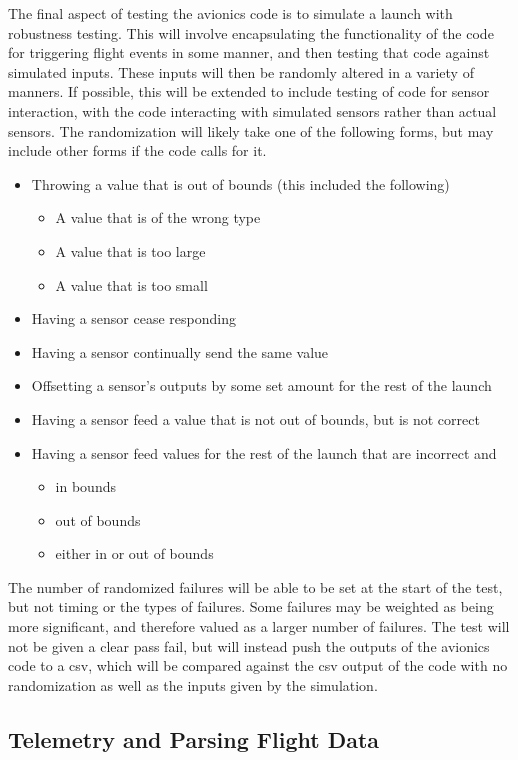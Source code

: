 \documentclass[onecolumn, draftclsnofoot, 10pt, compsoc]{IEEEtran}
\begin{document}
The final aspect of testing the avionics code is to simulate a launch with robustness testing. This will involve encapsulating the functionality of the code for triggering flight events in some manner, and then testing that code against simulated inputs. These inputs will then be randomly altered in a variety of manners. If possible, this will be extended to include testing of code for sensor interaction, with the code interacting with simulated sensors rather than actual sensors. The randomization will likely take one of the following forms, but may include other forms if the code calls for it. 
\begin{itemize}
\item Throwing a value that is out of bounds (this included the following)
\begin{itemize}
\item A value that is of the wrong type
\item A value that is too large
\item A value that is too small
\end{itemize}
\item Having a sensor cease responding
\item Having a sensor continually send the same value
\item Offsetting a sensor’s outputs by some set amount for the rest of the launch
\item Having a sensor feed a value that is not out of bounds, but is not correct
\item Having a sensor feed values for the rest of the launch that are incorrect and
\begin{itemize}
\item in bounds 
\item out of bounds
\item either in or out of bounds
\end{itemize}
\end{itemize}
The number of randomized failures will be able to be set at the start of the test, but not timing or the types of failures. Some failures may be weighted as being more significant, and therefore valued as a larger number of failures. The test will not be given a clear pass fail, but will instead push the outputs of the avionics code to a csv, which will be compared against the csv output of the code with no randomization as well as the inputs given by the simulation.

\subsection{Telemetry and Parsing Flight Data}
\end{document}
